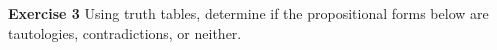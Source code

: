\documentclass[12pt,oneside]{exam}
\newenvironment{exercise}[1]{\vspace{.1in}\noindent\textbf{Exercise #1 \hspace{.05em}}}{}
\begin{document}
\begin{exercise}{3}
Using truth tables, determine if the propositional forms below are tautologies, contradictions, or neither.
\end{exercise}
\end{document}
